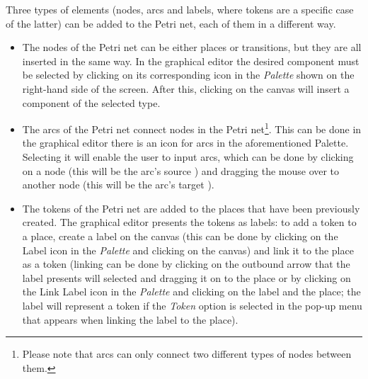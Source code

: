 Three types of elements (nodes, arcs and labels, where tokens are a specific case of the latter) can be added to the Petri net, each of them in a different way.
\begin{itemize}
  
\item The nodes of the Petri net can be either places or transitions, but they are all inserted in the same way. In the graphical editor the desired component must be selected by clicking on its corresponding icon in the \textit{Palette} shown on the right-hand side of the screen. After this, clicking on the canvas will insert a component of the selected type.
\item The arcs of the Petri net connect nodes in the Petri net\footnote{Please note that arcs can only connect two different types of nodes between them.}. This can be done in the graphical editor there is an icon for arcs in the aforementioned Palette. Selecting it will enable the user to input arcs, which can be done by clicking on a node (this will be the arc's source 
) and dragging the mouse over to another node (this will be the arc's target 
).
\item The tokens of the Petri net are added to the places that have been previously created. The graphical editor presents the tokens as labels: to add a token to a place, create a label on the canvas (this can be done by clicking on the Label icon in the \textit{Palette} and clicking on the canvas) and link it to the place as a token (linking can be done by clicking on the outbound arrow that the label presents will selected and dragging it on to the place or by clicking on the Link Label icon in the \textit{Palette} and clicking on the label and the place; the label will represent a token if the \textit{Token} option is selected in the pop-up menu that appears when linking the label to the place).
\end{itemize}

